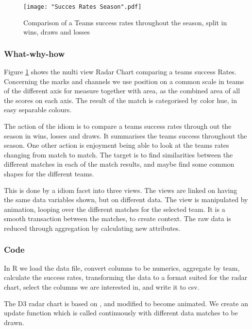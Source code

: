 \documentclass[Report.tex]{subfiles}
\begin{document}
\begin{figure}
\center
\texttt{[image: "Succes Rates Season".pdf]}
\caption{Comparison of a Teams success rates throughout the season, split in wins, draws and losses}
\label{Fig:CC}
\end{figure}


\subsubsection{What-why-how}
Figure \ref{Fig:CC} shows the multi view Radar Chart comparing a teams success Rates. Concerning the marks and channels we use position on a common scale in teams of the different axis for measure together with area, as the combined area of all the scores on each axis. The result of the match is categorised by color hue, in easy separable colours.  

The action of the idiom is to compare a teams success rates through out the season in wins, losses and draws. It summarises the teams success throughout the season. One other action is enjoyment being able to look at the teams rates changing from match to match.
The target is to find similarities between the different matches in each of the match results, and maybe find some common shapes for the different teams.

This is done by a idiom facet into three views. The views are linked on having the same data variables shown, but on different data. The view is manipulated by animation, looping over the different matches for the selected team. It is a smooth transaction between the matches, to create context. The raw data is reduced through aggregation by calculating new attributes.

\subsubsection{Code}
In R we load the data file, convert columns to be numerics, aggregate by team, calculate the success rates, transforming the data to a format suited for the radar chart, select the columns we are interested in, and write it to csv.

The D3 radar chart is based on \cite{Radar}, and modified to become animated. We create an update function which is called continuously with different data matches to be drawn. 
\end{document}
